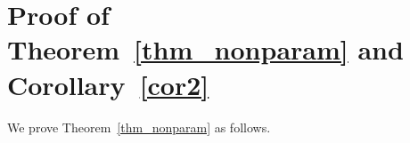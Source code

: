 %
%
%
%
%


\section{Proof of Theorem~\ref{thm_nonparam} and Corollary~\ref{cor2}}\label{proof_b}
We prove Theorem~\ref{thm_nonparam} as follows.

